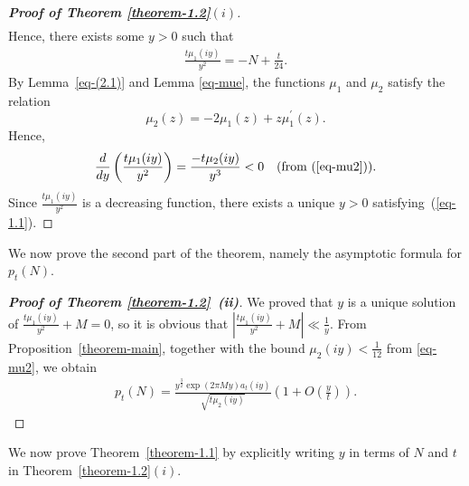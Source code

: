 \documentclass[11pt]{amsart}
\theoremstyle{plain}
\numberwithin{equation}{section}
\begin{document}
\begin{proof}[\textbf{\boldmath Proof of Theorem \ref{theorem-1.2}$(i)$}]
\begin{align*}
		\end{align*}
		Hence, there exists some $y>0$ such that 
		\begin{align*}
			\frac{t\mu_1(iy)}{y^{2}}=-N+\frac{t}{24}.  
		\end{align*}  
		By Lemma~\ref{eq-(2.1)} and Lemma \ref{eq-mue}, the functions $\mu_1$ and $\mu_2$ satisfy the relation $$\mu_2(z)=-2\mu_1(z)+z\mu_1^{\prime}(z).$$ Hence,
		\begin{align*}
			\frac{d}{dy}\left(\frac{t\mu_1(iy)}{y^{2}}\right)=\frac{-t\mu_2(iy)}{y^{3}}<0 \quad(\text{from (\ref{eq-mu2})}).    
		\end{align*}
		Since $\frac{t\mu_1(iy)}{y^{2}}$ is a decreasing function, there exists a unique $y>0$ satisfying~(\ref{eq-1.1}).
		
	\end{proof}
	We now prove the second part of the theorem, namely the asymptotic formula for $p_t(N)$.
	\begin{proof}[\textbf{\boldmath Proof of Theorem \ref{theorem-1.2}~(ii)}]
		We proved that $y$ is a unique solution of $\frac{t\mu_1(iy)}{y^{2}}+M=0$, so it is obvious that $\left|\frac{t\mu_1(iy)}{y^{2}}+M\right|\ll\frac{1}{y}$. From Proposition~\ref{theorem-main}, together with the bound $\mu_2(iy)<\frac{1}{12}$ from \eqref{eq-mu2}, we obtain
		\begin{align*}
			p_t(N)=\frac{y^{\frac{3}{2}}\exp(2\pi My)a_{t}(iy)}{\sqrt{t\mu_{2}(iy)}}\left(1+O\left(\frac{y}{t}\right)\right). 
		\end{align*}  
	\end{proof}
	We now prove Theorem~\ref{theorem-1.1} by explicitly writing $y$ in terms of $N$ and $t$ in Theorem~\ref{theorem-1.2}$(i)$. 
\end{document}
